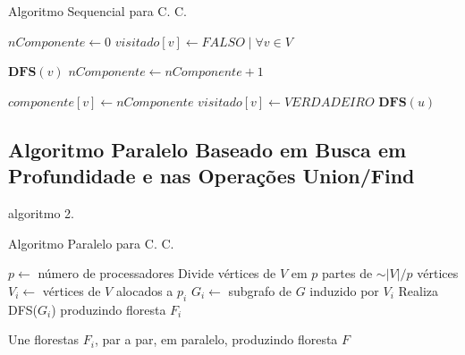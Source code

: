 \documentclass[12pt]{article}
\begin{document}
\begin{algorithm}
    \DontPrintSemicolon
    \caption{Algoritmo Sequencial para C. C.}
	{
        $nComponente \gets 0$\;
        $visitado[v] \gets FALSO \mid \forall v \in V$\;
    
        {
            {
                $\textbf{DFS}(v)$\;
                $nComponente \gets nComponente + 1$\;
            }
        }
    }
    
    {
        $componente[v] \gets nComponente$\; 
        $visitado[v] \gets VERDADEIRO$\;
        {
            {
                $\textbf{DFS}(u)$\;
            }
        }
    }
\end{algorithm}

\subsection{Algoritmo Paralelo Baseado em Busca em Profundidade e nas Operações Union/Find}

algoritmo 2.

\begin{algorithm}
    \DontPrintSemicolon
    \caption{Algoritmo Paralelo para C. C.}
    {
        $p \gets$ número de processadores\;
        Divide vértices de $V$ em $p$ partes de $\sim|V|/p$ vértices\;
        {
            $V_i \gets$ vértices de $V$ alocados a $p_i$\;
            $G_i \gets$ subgrafo de $G$ induzido por $V_i$\;
            Realiza DFS($G_i$) produzindo floresta $F_i$\;
        }

        Une florestas $F_i$, par a par, em paralelo, produzindo floresta $F$\;
        
    }
\end{algorithm}
\end{document}
